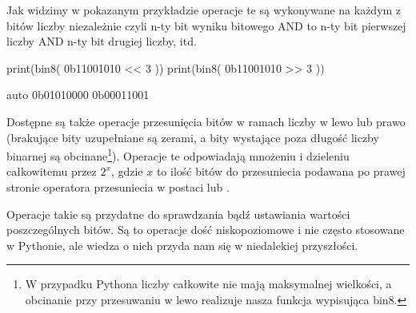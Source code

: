 Jak widzimy w pokazanym przykładzie operacje te są wykonywane na każdym z bitów liczby niezależnie czyli n-ty bit wyniku bitowego AND to n-ty bit pierwszej liczby AND n-ty bit drugiej liczby, itd.

\begin{CodeFrame}[python]{0.55\textwidth}
print(bin8( 0b11001010 << 3 ))
print(bin8( 0b11001010 >> 3 ))
\end{CodeFrame}
\begin{CodeFrame}{auto}
0b01010000
0b00011001
\end{CodeFrame}

Dostępne są także operacje przesunięcia bitów w ramach liczby w lewo lub prawo (brakujące bity uzupełniane są zerami, a bity wystające poza długość liczby binarnej są obcinane\footnote{
	W przypadku Pythona liczby całkowite nie mają maksymalnej wielkości, a obcinanie przy przesuwaniu w lewo realizuje nasza funkcja wypisująca bin8.
}). Operacje te odpowiadają mnożeniu i dzieleniu całkowitemu przez $2^x$, gdzie $x$ to ilość bitów do przesuniecia podawana po prawej stronie operatora przesuniecia w postaci \python{<<} lub \python{>>}.

Operacje takie są przydatne do sprawdzania bądź ustawiania wartości poszczególnych bitów.
Są to operacje dość niskopoziomowe i nie często stosowane w Pythonie, ale wiedza o nich przyda nam się w niedalekiej przyszłości.
